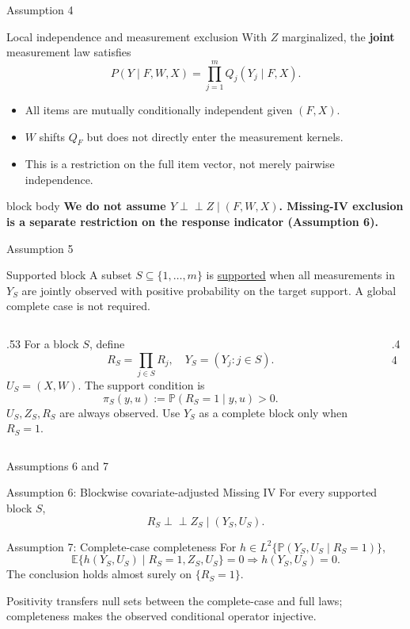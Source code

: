 \documentclass[aspectratio=169,10pt]{beamer}
\newcommand{\E}{\mathbb E}
\newcommand{\Prb}{\mathbb P}
\newcommand{\indep}{\mathrel{\perp\!\!\!\perp}}
\newcommand{\term}[1]{\underline{#1}}
\newenvironment{takeaway}{%
  \begin{beamercolorbox}[rounded=true,sep=.7em,wd=\linewidth]{block body}%
  \color{Navy}\bfseries}{\end{beamercolorbox}}
\begin{document}
\begin{frame}{Assumption 4}
\begin{block}{Local independence and measurement exclusion}
With $Z$ marginalized, the \textbf{joint} measurement law satisfies
\[
P(Y\mid F,W,X)=\prod_{j=1}^m Q_j(Y_j\mid F,X).
\]
\begin{itemize}
  \item All items are mutually conditionally independent given $(F,X)$.
  \item $W$ shifts $Q_F$ but does not directly enter the measurement kernels.
  \item This is a restriction on the full item vector, not merely pairwise independence.
\end{itemize}
\end{block}
\begin{takeaway}
We do not assume $Y\indep Z\mid(F,W,X)$. Missing-IV exclusion is a separate restriction on the response indicator (Assumption 6).
\end{takeaway}
\end{frame}





\begin{frame}{Assumption 5}
\begin{block}{Supported block}
A subset $S\subseteq\{1,\ldots,m\}$ is \term{supported} when all measurements in $Y_S$ are jointly observed with positive probability on the target support. A global complete case is not required.
\end{block}
\begin{columns}[c,onlytextwidth]
\begin{column}{.53\textwidth}
For a block $S$, define
\[
R_S=\prod_{j\in S}R_j,\quad Y_S=(Y_j:j\in S).
\]
$U_S=(X,W)$. The support condition is
\[
\pi_S(y,u):=\Prb(R_S=1\mid y,u)>0.
\]
$U_S,Z_S,R_S$ are always observed. Use $Y_S$ as a complete block only when $R_S=1$.
\end{column}
\begin{column}{.44\textwidth}
\centering

\end{column}
\end{columns}
\end{frame}

\begin{frame}{Assumptions 6 and 7}
\begin{block}{Assumption 6: Blockwise covariate-adjusted Missing IV}
For every supported block $S$,
\[
R_S\indep Z_S\mid(Y_S,U_S).
\]
\end{block}
\begin{block}{Assumption 7: Complete-case completeness}
For $h\in L^2\{\Prb(Y_S,U_S\mid R_S=1)\}$,
\[
\E\{h(Y_S,U_S)\mid R_S=1,Z_S,U_S\}=0
\Longrightarrow h(Y_S,U_S)=0.
\]
The conclusion holds almost surely on $\{R_S=1\}$.
\end{block}
Positivity transfers null sets between the complete-case and full laws; completeness makes the observed conditional operator injective.
\end{frame}
\end{document}
